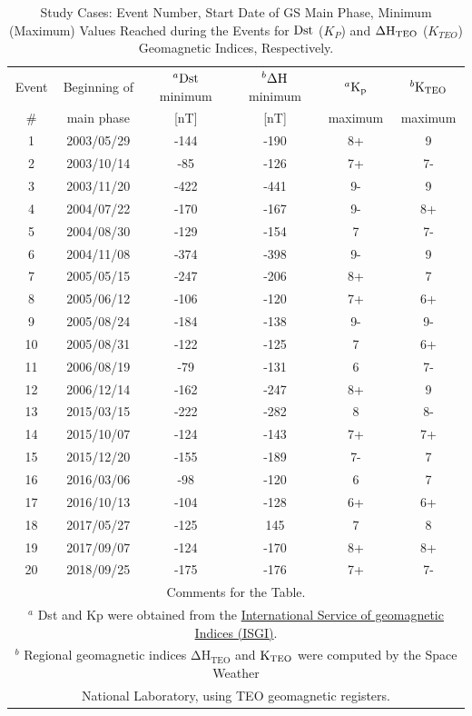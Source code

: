 \documentclass[a4paper,fleqn]{cas-dc}
\begin{document}
\begin{table}[h!]
\normalsize
\centering
    \caption{Study Cases: Event Number, Start Date of GS Main Phase, Minimum (Maximum) Values Reached during the Events for ${\rm Dst}$ (${K_P}$) and ${\rm \Delta H_{TEO}}$ (${K_{TEO}}$) Geomagnetic Indices, Respectively.}
    \label{table1:GS_descp}
\begin{tabular}{cccccc}
\toprule
Event & Beginning of & $^a {\rm Dst}$ minimum
 & $^b{\rm \Delta H}$ minimum
 & $^a{\rm K_p}$ & $^b {\rm K_{TEO}}$ \\
\#    & main phase & [nT] & [nT] & maximum & maximum\\
\midrule
1 & 2003/05/29 & -144 & -190 & 8+ & 9 \\ 
2 & 2003/10/14 & -85 & -126 & 7+ & 7- \\ 
3 & 2003/11/20 & -422 & -441 & 9- & 9 \\ 
4 & 2004/07/22 & -170 & -167 & 9- & 8+ \\ 
5 & 2004/08/30 & -129 & -154 & 7 & 7- \\ 
6 & 2004/11/08 & -374 & -398 & 9- & 9 \\ 
7 & 2005/05/15 & -247 & -206 & 8+ & 7 \\ 
8 & 2005/06/12 & -106 & -120 & 7+ & 6+ \\ 
9 & 2005/08/24 & -184 & -138 & 9- & 9- \\ 
10 & 2005/08/31 & -122 & -125 & 7 & 6+ \\ 
11 & 2006/08/19 & -79 & -131 & 6 & 7- \\ 
12 & 2006/12/14 & -162 & -247 & 8+ & 9 \\ 
13 & 2015/03/15 & -222 & -282 & 8 & 8- \\ 
14 & 2015/10/07 & -124 & -143 & 7+ & 7+ \\ 
15 & 2015/12/20 & -155 & -189 & 7- & 7 \\ 
16 & 2016/03/06 & -98 & -120 & 6 & 7 \\ 
17 & 2016/10/13 & -104 & -128 & 6+ & 6+ \\ 
18 & 2017/05/27 & -125 & 145 & 7 & 8 \\ 
19 & 2017/09/07 & -124 & -170 & 8+ & 8+ \\ 
20 & 2018/09/25 & -175 & -176 & 7+ & 7- \\ 
\bottomrule
\multicolumn{6}{L}{Comments for the Table.} \\
\multicolumn{6}{L}{$^a$ Dst and Kp were obtained from the \href{http://isgi.unistra.fr/data_download.php}{International Service of geomagnetic Indices (ISGI)}.}\\
\multicolumn{6}{L}{$^b$ Regional geomagnetic indices $\mathrm{\Delta H_{TEO}}$ and ${\rm K_{TEO}}$ were computed by the Space Weather} \\
\multicolumn{6}{L}{National Laboratory, using TEO geomagnetic registers.}    \end{tabular}
\end{table}
\end{document}

